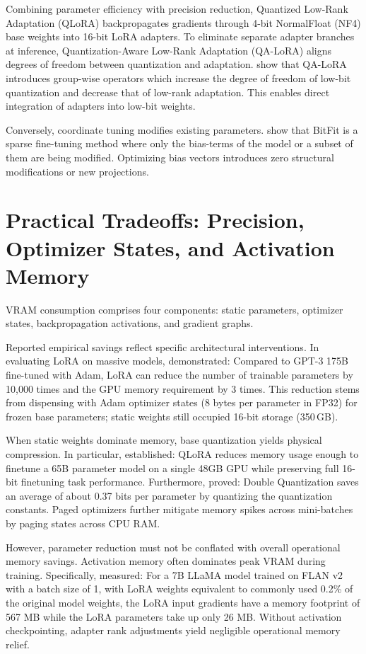 \documentclass[11pt,a4paper]{article}
\begin{document}
Combining parameter efficiency with precision reduction, Quantized Low-Rank Adaptation (QLoRA) \citep{dettmers2023qlora} backpropagates gradients through 4-bit NormalFloat (NF4) base weights into 16-bit LoRA adapters. To eliminate separate adapter branches at inference, Quantization-Aware Low-Rank Adaptation (QA-LoRA) \citep{xu2023qa} aligns degrees of freedom between quantization and adaptation. \citet{xu2023qa} show that QA-LoRA introduces group-wise operators which increase the degree of freedom of low-bit quantization and decrease that of low-rank adaptation. This enables direct integration of adapters into low-bit weights.

Conversely, coordinate tuning modifies existing parameters. \citet{zaken2022bitfit} show that BitFit is a sparse fine-tuning method where only the bias-terms of the model or a subset of them are being modified. Optimizing bias vectors introduces zero structural modifications or new projections.

\section{Practical Tradeoffs: Precision, Optimizer States, and Activation Memory}

VRAM consumption comprises four components: static parameters, optimizer states, backpropagation activations, and gradient graphs.

Reported empirical savings reflect specific architectural interventions. In evaluating LoRA on massive models, \citet{hu2021lora} demonstrated: Compared to GPT-3 175B fine-tuned with Adam, LoRA can reduce the number of trainable parameters by 10,000 times and the GPU memory requirement by 3 times. This reduction stems from dispensing with Adam optimizer states (8 bytes per parameter in FP32) for frozen base parameters; static weights still occupied 16-bit storage (350\,GB).

When static weights dominate memory, base quantization yields physical compression. In particular, \citet{dettmers2023qlora} established: QLoRA reduces memory usage enough to finetune a 65B parameter model on a single 48GB GPU while preserving full 16-bit finetuning task performance. Furthermore, \citet{dettmers2023qlora} proved: Double Quantization saves an average of about 0.37 bits per parameter by quantizing the quantization constants. Paged optimizers further mitigate memory spikes across mini-batches by paging states across CPU RAM.

However, parameter reduction must not be conflated with overall operational memory savings. Activation memory often dominates peak VRAM during training. Specifically, \citet{dettmers2023qlora} measured: For a 7B LLaMA model trained on FLAN v2 with a batch size of 1, with LoRA weights equivalent to commonly used 0.2\% of the original model weights, the LoRA input gradients have a memory footprint of 567 MB while the LoRA parameters take up only 26 MB. Without activation checkpointing, adapter rank adjustments yield negligible operational memory relief.
\end{document}
